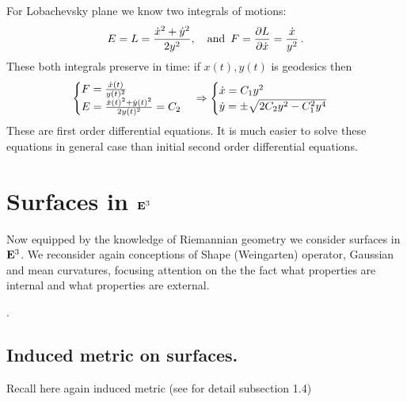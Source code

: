 \documentclass[12pt]{article}
\theoremstyle{theorem}
\numberwithin{equation}{section}
\begin{document}
{  For Lobachevsky plane we know two integrals of motions:
  \begin{equation}\label{energyforlobacchevskyplaneandsecondintegral}
    E=L={{\dot x^2+\dot y^2\over 2y^2}},\quad {\rm and}\,\,\,
     F={\partial L\over \partial \dot x}={\dot x\over y^2}\,.
  \end{equation}
         These both integrals preserve in time: if $x(t),y(t)$ is geodesics then
         $$
         \begin{cases}
         F={\dot x(t)\over y(t)^2}\cr
         E={{\dot x(t)^2+\dot y(t)^2\over 2y(t)^2}}=C_2\cr
         \end{cases}\Rightarrow
         \begin{cases}
         \dot x=C_1y^2\cr
         \dot y=\pm\sqrt {2C_2y^2-C_1^2y^4}\cr
         \end{cases}
                 $$
  These are first order differential equations.  It is much easier to solve these equations in general case
  than initial second order differential equations.



\section {Surfaces in ${\bf E}^3$}

 Now equipped by the knowledge of Riemannian geometry we consider surfaces in ${\bf E}^3$. We
  reconsider again conceptions of Shape (Weingarten) operator, Gaussian and mean curvatures,
  focusing attention on the the fact what properties are internal and what properties are external.


.
 \subsection{ Induced metric on surfaces.}

   Recall here again induced metric (see for detail subsection 1.4)

}
\end{document}
